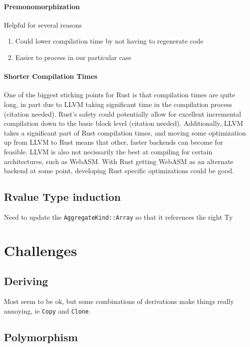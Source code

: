 \documentclass[12pt,final]{article}
\begin{document}
\paragraph{Premonomorphization} Helpful for several reasons
\begin{enumerate}
\item Could lower compilation time by not having to regenerate code
\item  Easier to process in our particular case
\end{enumerate}

\paragraph{Shorter Compilation Times} One of the biggest sticking points for
Rust is that compilation times are quite long, in part due to LLVM taking
significant time in the compilation process (citation needed). Rust's safety
could potentially allow for excellent incremental compilation down to the basic
block level (citation needed). Additionally, LLVM takes a significant part of
Rust compilation times, and moving some optimization up from LLVM to Rust means
that other, faster backends can become for feasible. LLVM is also not
necissarily the best at compiling for certain architectures, such as WebASM.
With Rust getting WebASM as an alternate backend at some point, developing Rust
specific optimizations could be good.


\subsection{Rvalue Type induction}
Need to update the \texttt{AggregateKind::Array} so that it references the right Ty

\section{Challenges}
\label{sec:annoying}

\subsection{Deriving}
Most seem to be ok, but some combinations of derivations make things really
annoying, ie \texttt{Copy} and \texttt{Clone}.

\subsection{Polymorphism}
\end{document}
